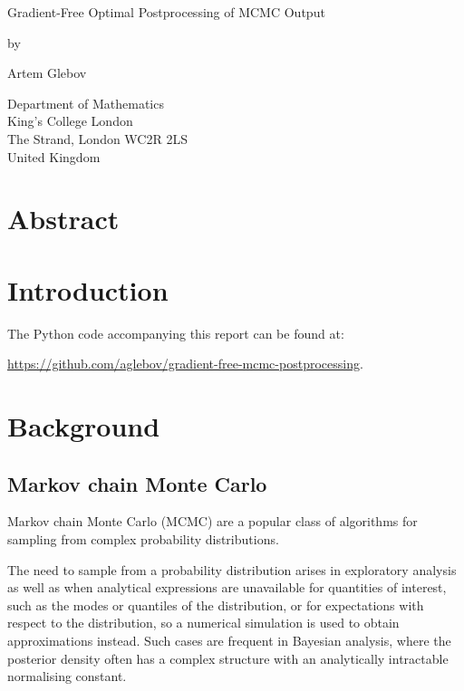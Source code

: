 \documentclass[12pt,a4paper]{report}
\date{}
\begin{document}
\thispagestyle{empty}
\begin{center}
{\huge
Gradient-Free Optimal Postprocessing of MCMC Output

\bigskip
\bigskip

by
\bigskip
\bigskip

Artem Glebov
}
\end{center}
\vfill

\begin{center}
{\large
Department of Mathematics\\
King's College London\\
The Strand, London WC2R 2LS\\
United Kingdom\\
\medskip

}
\end{center}
\bigskip


\newpage
\setcounter{page}{1}

\chapter*{Abstract}


\tableofcontents


\chapter*{Introduction}

The Python code accompanying this report can be found at:
\begin{center}
\url{https://github.com/aglebov/gradient-free-mcmc-postprocessing}.
\end{center}

\chapter{Background}

\section{Markov chain Monte Carlo}

Markov chain Monte Carlo (MCMC) are a popular class of algorithms for sampling from complex probability distributions.

The need to sample from a probability distribution arises in exploratory analysis as well as when analytical expressions are unavailable for quantities of interest, such as the modes or quantiles of the distribution, or for expectations with respect to the distribution, so a numerical simulation is used to obtain approximations instead. Such cases are frequent in Bayesian analysis, where the posterior density often has a complex structure with an analytically intractable normalising constant.
\end{document}
